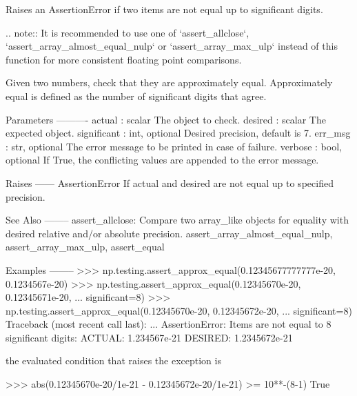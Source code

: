 \begin{DoxyVerb}Raises an AssertionError if two items are not equal up to significant
digits.

.. note:: It is recommended to use one of `assert_allclose`,
          `assert_array_almost_equal_nulp` or `assert_array_max_ulp`
          instead of this function for more consistent floating point
          comparisons.

Given two numbers, check that they are approximately equal.
Approximately equal is defined as the number of significant digits
that agree.

Parameters
----------
actual : scalar
    The object to check.
desired : scalar
    The expected object.
significant : int, optional
    Desired precision, default is 7.
err_msg : str, optional
    The error message to be printed in case of failure.
verbose : bool, optional
    If True, the conflicting values are appended to the error message.

Raises
------
AssertionError
  If actual and desired are not equal up to specified precision.

See Also
--------
assert_allclose: Compare two array_like objects for equality with desired
                 relative and/or absolute precision.
assert_array_almost_equal_nulp, assert_array_max_ulp, assert_equal

Examples
--------
>>> np.testing.assert_approx_equal(0.12345677777777e-20, 0.1234567e-20)
>>> np.testing.assert_approx_equal(0.12345670e-20, 0.12345671e-20,
...                                significant=8)
>>> np.testing.assert_approx_equal(0.12345670e-20, 0.12345672e-20,
...                                significant=8)
Traceback (most recent call last):
    ...
AssertionError:
Items are not equal to 8 significant digits:
 ACTUAL: 1.234567e-21
 DESIRED: 1.2345672e-21

the evaluated condition that raises the exception is

>>> abs(0.12345670e-20/1e-21 - 0.12345672e-20/1e-21) >= 10**-(8-1)
True\end{DoxyVerb}
 \mbox{\label{namespacenumpy_1_1testing_1_1__private_1_1utils_ad2b735efdc64db6ce9e7307391947c91}} 
